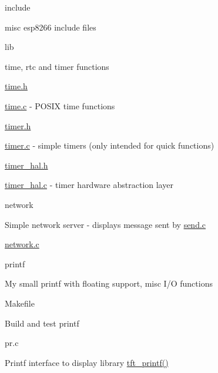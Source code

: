 \begin{DoxyItemize}
\begin{DoxyItemize}
\begin{DoxyItemize}
\begin{DoxyItemize}
\end{DoxyItemize}
\end{DoxyItemize}
\end{DoxyItemize}
\item include
\begin{DoxyItemize}
\item misc esp8266 include files
\end{DoxyItemize}
\item lib
\begin{DoxyItemize}
\item time, rtc and timer functions
\begin{DoxyItemize}
\item \hyperlink{time_8h}{time.\-h}
\item \hyperlink{time_8c}{time.\-c} -\/ P\-O\-S\-I\-X time functions
\item \hyperlink{timer_8h}{timer.\-h}
\item \hyperlink{timer_8c}{timer.\-c} -\/ simple timers (only intended for quick functions)
\item \hyperlink{timer__hal_8h}{timer\-\_\-hal.\-h}
\item \hyperlink{timer__hal_8c}{timer\-\_\-hal.\-c} -\/ timer hardware abstraction layer
\end{DoxyItemize}
\end{DoxyItemize}
\item network
\begin{DoxyItemize}
\item Simple network server -\/ displays message sent by \hyperlink{send_8c}{send.\-c}
\begin{DoxyItemize}
\item \hyperlink{network_8c}{network.\-c}
\end{DoxyItemize}
\end{DoxyItemize}
\item printf
\begin{DoxyItemize}
\item My small printf with floating support, misc I/\-O functions
\begin{DoxyItemize}
\item Makefile
\begin{DoxyItemize}
\item Build and test printf
\end{DoxyItemize}
\item pr.\-c
\begin{DoxyItemize}
\item Printf interface to display library \hyperlink{tft__printf_8c_ad6d6dda4facdc045d477c0cc9403e0c1}{tft\-\_\-printf()}

\end{DoxyItemize}
\end{DoxyItemize}
\end{DoxyItemize}
\end{DoxyItemize}
